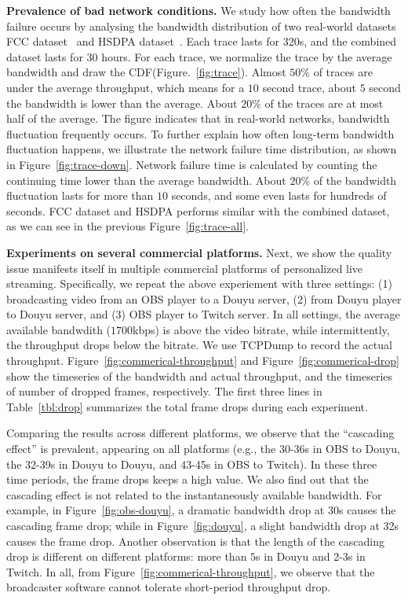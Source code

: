 
\textbf{Prevalence of bad network conditions.} We study how often the bandwidth failure occurs by analysing the bandwidth distribution of two real-world datasets \textemdash\xspace FCC dataset~\cite{FCC_dataset} and HSDPA dataset~\cite{HSDPA_dataset}. Each trace lasts for 320s, and the combined dataset lasts for $30$ hours. For each trace, we normalize the trace by the average bandwidth and draw the CDF(Figure.~\ref{fig:trace}). Almost $50\%$ of traces are under the average throughput, which means for a $10$ second trace, about $5$ second the bandwidth is lower than the average. About $20\%$ of the traces are at most half of the average. The figure indicates that in real-world networks, bandwidth fluctuation frequently occurs. To further explain how often long-term bandwidth fluctuation happens, we illustrate the network failure time distribution, as shown in Figure~\ref{fig:trace-down}. Network failure time is calculated by counting the continuing time lower than the average bandwidth. About $20\%$ of the bandwidth fluctuation lasts for more than $10$ seconds, and some even lasts for hundreds of seconds. FCC dataset and HSDPA performs similar with the combined dataset, as we can see in the previous Figure~\ref{fig:trace-all}.


\textbf{Experiments on several commercial platforms.}
Next, we show the quality issue manifests itself in multiple
commercial platforms of personalized live streaming. Specifically, we
repeat the above experiement with three settings: (1) broadcasting
video from an OBS player to a Douyu server, (2) from Douyu player to
Douyu server, and (3) OBS player to Twitch server. In all settings,
the average available bandwdith ($1700$kbps) is above the video
bitrate, while intermittently, the throughput drops below the
bitrate. We use TCPDump to record the actual throughput.
Figure~\ref{fig:commerical-throughput} and
Figure~\ref{fig:commerical-drop} show the timeseries of the
bandwidth and actual throughput, and the timeseries of number of
dropped frames, respectively. The first three lines in
Table~\ref{tbl:drop} summarizes the total frame drops during each
experiment.

Comparing the results across different platforms, we observe that the ``cascading effect'' is prevalent, appearing on all platforms (e.g., the 30-36s in OBS to Douyu, the 32-39s in Douyu to Douyu, and 43-45s in OBS to Twitch). In these three time periods, the frame drops keeps a high value. We also find out that the cascading effect is not related to the instantaneously available bandwidth. For example, in Figure~\ref{fig:obs-douyu}, a dramatic bandwidth drop at 30s causes the cascading frame drop; while in Figure~\ref{fig:douyu}, a slight bandwidth drop at 32s causes the frame drop. Another observation is that the length of the cascading drop is different on different platforms: more than $5$s in Douyu and 2-3s in Twitch. In all, from Figure~\ref{fig:commerical-throughput}, we observe that the broadcaster software cannot tolerate short-period throughput drop.

